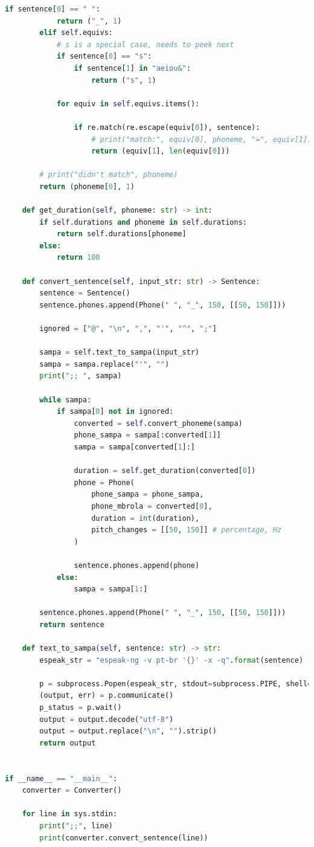 \begin{lstlisting}[caption=Conversor eSpeakNG-MBROLA, label=conversao, language=Python]
        if sentence[0] == " ":
            return ("_", 1)
        elif self.equivs:
            # s is a special case, needs to peek next
            if sentence[0] == "s":
                if sentence[1] in "aeiou&":
                    return ("s", 1)

            for equiv in self.equivs.items():

                if re.match(re.escape(equiv[0]), sentence):
                    # print("match:", equiv[0], phoneme, "=", equiv[1])
                    return (equiv[1], len(equiv[0]))

        # print("didn't match", phoneme)
        return (phoneme[0], 1)

    def get_duration(self, phoneme: str) -> int:
        if self.durations and phoneme in self.durations:
            return self.durations[phoneme]
        else:
            return 100

    def convert_sentence(self, input_str: str) -> Sentence:
        sentence = Sentence()
        sentence.phones.append(Phone(" ", "_", 150, [[50, 150]]))

        ignored = ["@", "\n", ",", "'", "^", ";"]

        sampa = self.text_to_sampa(input_str)
        sampa = sampa.replace("'", "")
        print(";; ", sampa)

        while sampa:
            if sampa[0] not in ignored:
                converted = self.convert_phoneme(sampa)
                phone_sampa = sampa[:converted[1]]
                sampa = sampa[converted[1]:]

                duration = self.get_duration(converted[0])
                phone = Phone(
                    phone_sampa = phone_sampa,
                    phone_mbrola = converted[0],
                    duration = int(duration),
                    pitch_changes = [[50, 150]] # percentage, Hz
                )

                sentence.phones.append(phone)
            else:
                sampa = sampa[1:]

        sentence.phones.append(Phone(" ", "_", 150, [[50, 150]]))
        return sentence

    def text_to_sampa(self, sentence: str) -> str:
        espeak_str = "espeak-ng -v pt-br '{}' -x -q".format(sentence)

        p = subprocess.Popen(espeak_str, stdout=subprocess.PIPE, shell=True)
        (output, err) = p.communicate()
        p_status = p.wait()
        output = output.decode("utf-8")
        output = output.replace("\n", "").strip()
        return output


if __name__ == "__main__":
    converter = Converter()

    for line in sys.stdin:
        print(";;", line)
        print(converter.convert_sentence(line))
\end{lstlisting}
